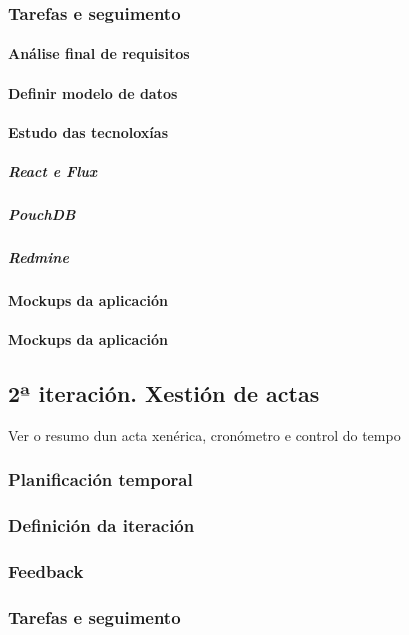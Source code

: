       \subsubsection{Tarefas e seguimento}

        \paragraph{Análise final de requisitos}
        \paragraph{Definir modelo de datos}
        \paragraph{Estudo das tecnoloxías}
          \subparagraph{React e Flux}
          \subparagraph{PouchDB}
          \subparagraph{Redmine}
        \paragraph{Mockups da aplicación}
        \paragraph{Mockups da aplicación}
          \subparagraph{}
          \subparagraph{}
          \subparagraph{}

    \subsection{2ª iteración. Xestión de actas}
    Ver o resumo dun acta xenérica, cronómetro e control do tempo 
      \subsubsection{Planificación temporal}
      \subsubsection{Definición da iteración}
      \subsubsection{Feedback}
      \subsubsection{Tarefas e seguimento}


